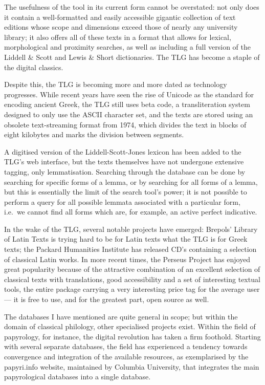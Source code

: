 The usefulness of the tool in its current form cannot be overstated:
not only does it contain a well-formatted and easily accessible
gigantic collection of text editions whose scope and dimensions exceed
those of nearly any university library; it also offers all of these
texts in a format that allows for lexical, morphological and proximity
searches, as well as including a full version of the Liddell \& Scott
and Lewis \& Short dictionaries. The TLG has become a staple of the
digital classics.

Despite this, the TLG is becoming more and more dated as technology
progresses.  While recent years have seen the rise of Unicode as the
standard for encoding ancient Greek, the TLG still uses beta code, a
transliteration system designed to only use the ASCII character set,
and the texts are stored using an obsolete text-streaming format from
1974, which divides the text in blocks of eight kilobytes and marks
the division between segments.

A digitised version of the Liddell-Scott-Jones lexicon has been added
to the TLG's web interface, but the texts themselves have not
undergone extensive tagging, only lemmatisation.  Searching through
the database can be done by searching for specific forms of a lemma,
or by searching for all forms of a lemma, but this is essentially the
limit of the search tool's power; it is not possible to perform a
query for all possible lemmata associated with a particular form,
i.e.\ we cannot find all forms which are, for example, an active
perfect indicative.

In the wake of the TLG, several notable projects have emerged:
Brepols' Library of Latin Texts is trying hard to be for Latin texts
what the TLG is for Greek texts; the Packard Humanities Institute has
released CD's containing a selection of classical Latin works. In more
recent times, the Perseus Project has enjoyed great popularity because
of the attractive combination of an excellent selection of classical
texts with translations, good accessibility and a set of interesting
textual tools, the entire package carrying a very interesting price
tag for the average user — it is free to use, and for the greatest
part, open source as well.

The databases I have mentioned are quite general in scope; but within
the domain of classical philology, other specialised projects
exist. Within the field of papyrology, for instance, the digital
revolution has taken a firm foothold. Starting with several separate
databases, the field has experienced a tendency towards convergence
and integration of the available resources, as exemplarised by the
papyri.info website, maintained by Columbia University, that
integrates the main papyrological databases into a single database.

